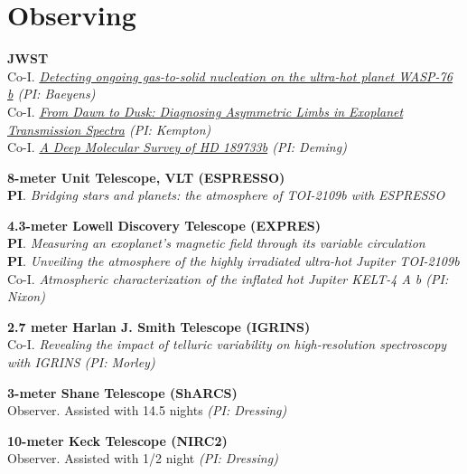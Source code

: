 \documentclass[letterpaper,10.5pt]{article}
\newcommand{\resumeSubHeadingListEnd}{\end{itemize}}
\newcommand{\shorterSection}[1]{\vspace{-10pt}\section{#1}}
\begin{document}

\shorterSection{Observing}

\small
  \begin{list}{}{\cvlist}  

  
  
  \item[{\color{numcolor}}]\textbf{JWST} \\
  Co-I. \textit{\href{https://www.stsci.edu/jwst/science-execution/program-information?id=6045}{Detecting ongoing gas-to-solid nucleation on the ultra-hot planet WASP-76 b} (PI: Baeyens)} \\
  Co-I. \textit{\href{https://www.stsci.edu/jwst/science-execution/program-information?id=5275}{From Dawn to Dusk: Diagnosing Asymmetric Limbs in Exoplanet Transmission Spectra} (PI: Kempton)} \\ 
  Co-I. \textit{\href{https://www.stsci.edu/jwst/science-execution/program-information?id=1633}{A Deep Molecular Survey of HD 189733b} (PI: Deming)}

  \item[{\color{numcolor}}]\textbf{8-meter Unit Telescope, VLT (ESPRESSO)} \\
\textbf{PI}. \textit{Bridging stars and planets: the atmosphere of TOI-2109b with ESPRESSO} \\

  \item[{\color{numcolor}}]\textbf{4.3-meter Lowell Discovery Telescope (EXPRES)} \\
      \textbf{PI}. \textit{Measuring an exoplanet’s magnetic field through its variable circulation}\\
     \textbf{PI}. \textit{Unveiling the atmosphere of the highly irradiated ultra-hot Jupiter TOI-2109b}\\
     Co-I. \textit{Atmospheric characterization of the inflated hot Jupiter KELT-4 A b (PI: Nixon)}


     \item[{\color{numcolor}}]\textbf{2.7 meter Harlan J. Smith Telescope (IGRINS)} \\
     Co-I. \textit{Revealing the impact of telluric variability on high-resolution spectroscopy with IGRINS (PI: Morley)}

     \item[{\color{numcolor}}]\textbf{3-meter Shane Telescope (ShARCS)} \\
     Observer. Assisted with 14.5 nights \textit{(PI: Dressing)}
     \item[{\color{numcolor}}]\textbf{10-meter Keck Telescope (NIRC2)} \\
     Observer. Assisted with 1/2 night \textit{(PI: Dressing)}
  
  \end{list}
\end{document}
